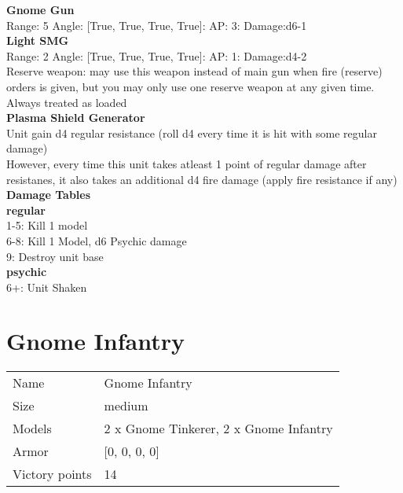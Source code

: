 {\bf Gnome Gun } \\



Range: 5  Angle: [True, True, True, True]: AP: 3: Damage:d6-1 \\




{\bf Light SMG } \\



Range: 2  Angle: [True, True, True, True]: AP: 1: Damage:d4-2 \\
Reserve weapon: may use this weapon instead of main gun when fire (reserve) orders is given, but you may only use one reserve weapon at any given time.\\ 
Always treated as loaded\\ 




{\bf Plasma Shield Generator } \\

Unit gain d4 regular resistance (roll d4 every time it is hit with some regular damage)\\ 
However, every time this unit takes atleast 1 point of regular damage after resistanes, it also takes an additional d4 fire damage (apply fire resistance if any)\\ 





 





{\bf Damage Tables} \\
 {\bf regular } \\
1-5: Kill 1 model \\
6-8: Kill 1 Model, d6 Psychic damage \\
9: Destroy unit base \\
 {\bf psychic } \\
6+: Unit Shaken \\










\pagebreak\pagebreak

\section{ Gnome Infantry }

\begin{tabular}{ll}
  Name & Gnome Infantry \\
  Size & medium\\
  Models & 2 x Gnome Tinkerer, 2 x Gnome Infantry\\
  Armor & [0, 0, 0, 0]\\
  Victory points & 14\\
\end{tabular}

